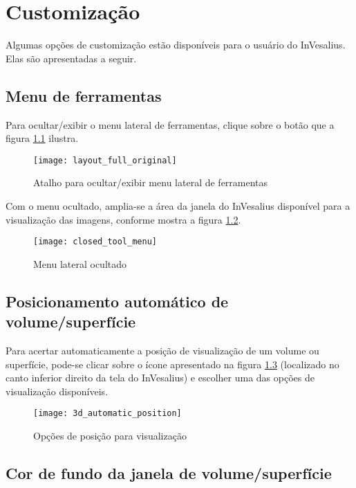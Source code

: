 \chapter{Customização}

Algumas opções de customização estão disponíveis para o usuário do InVesalius. Elas
são apresentadas a seguir.

\section{Menu de ferramentas}

Para ocultar/exibir o menu lateral de ferramentas, clique sobre o botão que a figura
\ref{fig:layout_full_original} ilustra.

\begin{figure}[!htb]
\centering
\texttt{[image: layout\_full\_original]}
\caption{Atalho para ocultar/exibir menu lateral de ferramentas}
\label{fig:layout_full_original}
\end{figure}

Com o menu ocultado, amplia-se a área da janela do InVesalius disponível para a
visualização das imagens, conforme mostra a figura \ref{fig:closed_tool_menu}.

\begin{figure}[!htb]
\centering
\texttt{[image: closed\_tool\_menu]}
\caption{Menu lateral ocultado}
\label{fig:closed_tool_menu}
\end{figure}

\newpage

\section{Posicionamento automático de volume/superfície}

Para acertar automaticamente a posição de visualização de um volume ou superfície,
pode-se clicar sobre o ícone apresentado na figura \ref{fig:3d_automatic_position}
(localizado no canto inferior direito da tela do InVesalius) e escolher uma das
opções de visualização disponíveis.

\begin{figure}[!htb]
\centering
\texttt{[image: 3d\_automatic\_position]}
\caption{Opções de posição para visualização}
\label{fig:3d_automatic_position}
\end{figure}

\section{Cor de fundo da janela de volume/superfície}

